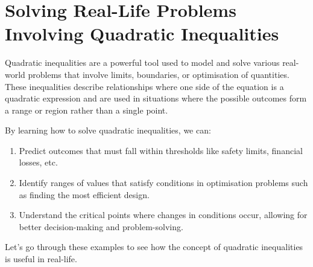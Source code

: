 \section{Solving Real-Life Problems Involving Quadratic Inequalities}

Quadratic inequalities are a powerful tool used to model and solve various real-world
problems that involve limits, boundaries, or optimisation of quantities.
These inequalities describe relationships where one side of the equation is a
quadratic expression and are used in situations where the possible outcomes form
a range or region rather than a single point.

By learning how to solve quadratic inequalities, we can:
\begin{enumerate}
  \item Predict outcomes that must fall within thresholds like safety limits, financial
  losses, etc.
  \item Identify ranges of values that satisfy conditions in optimisation problems
  such as finding the most efficient design.
  \item Understand the critical points where changes in conditions occur, allowing
  for better decision-making and problem-solving.
\end{enumerate}
Let's go through these examples to see how the concept of quadratic inequalities
is useful in real-life.

